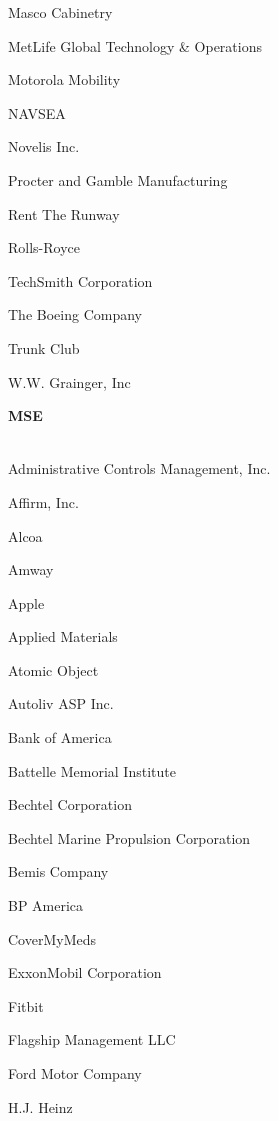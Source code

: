 \documentclass[twoside]{article}
\begin{document}
\begin{center}
\begin{multicols}{5}
\begin{FlushLeft}
\begin{compactitem}
\item Masco Cabinetry
\item MetLife Global Technology \& Operations
\item Motorola Mobility
\item NAVSEA
\item Novelis Inc.
\item Procter and Gamble Manufacturing
\item Rent The Runway
\item Rolls-Royce
\item TechSmith Corporation
\item The Boeing Company
\item Trunk Club
\item W.W. Grainger, Inc
\end{compactitem}
        \end{FlushLeft}
        \vspace{1em}
        {\fontsize{14}{16}\selectfont \bf MSE}\\
        \vspace{-1em}
        ~\hrulefill~
        \vspace{-.9em}
        \begin{FlushLeft}
        \begin{compactitem}
        \item Administrative Controls Management, Inc.
\item Affirm, Inc.
\item Alcoa
\item Amway
\item Apple
\item Applied Materials
\item Atomic Object
\item Autoliv ASP Inc.
\item Bank of America
\item Battelle Memorial Institute
\item Bechtel Corporation
\item Bechtel Marine Propulsion Corporation
\item Bemis Company
\item BP America
\item CoverMyMeds
\item ExxonMobil Corporation
\item Fitbit
\item Flagship Management LLC
\item Ford Motor Company
\item H.J. Heinz

\end{compactitem}
\end{FlushLeft}
\end{multicols}
\end{center}
\end{document}
